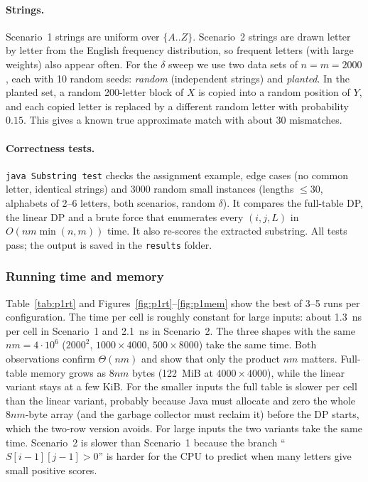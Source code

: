 \documentclass[11pt]{article}
\begin{document}
\paragraph{Strings.} Scenario~1 strings are uniform over $\{A..Z\}$.
Scenario~2 strings are drawn letter by letter from the English frequency
distribution, so frequent letters (with large weights) also appear often. For
the $\delta$ sweep we use two data sets of $n=m=2000$, each with 10 random seeds:
\emph{random} (independent strings) and \emph{planted}. In the planted set, a
random 200-letter block of $X$ is copied into a random position of $Y$, and
each copied letter is replaced by a different random letter with probability
$0.15$. This gives a known true approximate match with about 30 mismatches.

\paragraph{Correctness tests.} \texttt{java Substring test} checks the assignment
example, edge cases (no common letter, identical strings) and 3000 random
small instances (lengths $\le30$, alphabets of 2--6 letters, both scenarios,
random $\delta$). It compares the full-table DP, the linear DP and a brute
force that enumerates every $(i,j,L)$ in $O(nm\min(n,m))$ time. It also re-scores
the extracted substring. All tests pass; the output is saved in the \texttt{results} folder.

\subsubsection{Running time and memory}
Table~\ref{tab:p1rt} and Figures~\ref{fig:p1rt}--\ref{fig:p1mem} show the
best of 3--5 runs per configuration. The time per cell is roughly constant
for large inputs: about 1.3~ns per cell in Scenario~1 and 2.1~ns in
Scenario~2. The three shapes with the same $nm=4\cdot10^6$ ($2000^2$,
$1000\times4000$, $500\times8000$) take the same time. Both observations
confirm $\Theta(nm)$ and show that only the product $nm$ matters. Full-table
memory grows as $8nm$ bytes (122~MiB at $4000\times4000$), while the linear
variant stays at a few KiB. For the smaller inputs the full table is slower
per cell than the linear variant, probably because Java must allocate and
zero the whole $8nm$-byte array (and the garbage collector must reclaim it)
before the DP starts, which the two-row version avoids.
For large inputs the two variants take the same time. Scenario~2 is slower
than Scenario~1 because the branch ``$S[i-1][j-1]>0$'' is harder for the CPU
to predict when many letters give small positive scores.
\end{document}
